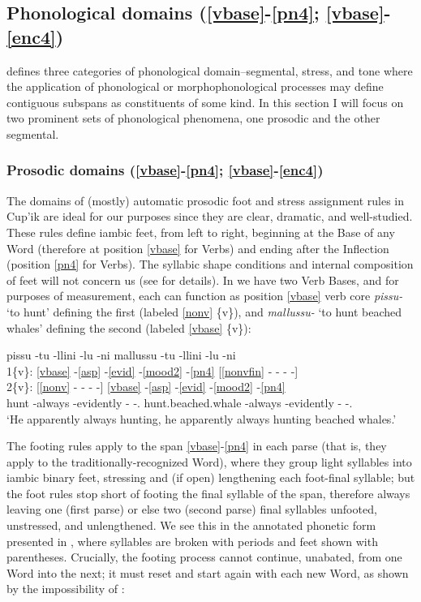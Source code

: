 \documentclass[output=paper]{langscibook}
\begin{document}
\subsection{Phonological domains (\ref{vbase}-\ref{pn4}; \ref{vbase}-\ref{enc4})} 
\label{sec:5.7}

\citet[16]{Tallman2021} defines three categories of phonological domain--segmental, stress, and tone where the application of phonological or morphophonological processes may define contiguous subspans as constituents of some kind. In this section I will focus on two prominent sets of phonological phenomena, one prosodic and the other segmental.

\subsubsection{Prosodic domains (\ref{vbase}-\ref{pn4}; \ref{vbase}-\ref{enc4})} \label{sec:5.7.1}

The domains of (mostly) automatic prosodic foot and stress assignment rules in Cup'ik are ideal for our purposes since they are clear, dramatic, and well-studied. These rules define iambic feet, from left to right, beginning at the Base of any Word (therefore at position \ref{vbase} for Verbs) and ending after the Inflection (position \ref{pn4} for Verbs). The syllabic shape conditions and internal composition of feet will not concern us (see \citealt{Woodbury1981,Woodbury1987} for details). In  we have two Verb Bases, and for purposes of measurement, each can function as position \ref{vbase} verb core \textit{pissu-} `to hunt' defining the first (labeled \ref{nonv} \{v\}), and \textit{mallussu-} `to hunt beached whales' defining the second (labeled \ref{vbase} \{v\}):

\ea\label{ex:key:39}
\gllll {} pissu -tu -llini -lu -ni mallussu -tu -llini -lu -ni \\
    1\{v\}: \ref{vbase} -\ref{asp} -\ref{evid} -\ref{mood2} -\ref{pn4} [\ref{nonvfin} - - - -] \\
    2\{v\}: [\ref{nonv} - - - -] \ref{vbase} -\ref{asp} -\ref{evid} -\ref{mood2} -\ref{pn4} \\
      {} hunt -always -evidently -\Appos{} -\Tsg{}.\Sarg{} hunt.beached.whale -always -evidently -\Appos{} -\Tsg{}.\Sarg{} \\
\glt `He apparently always hunting, he apparently always hunting beached whales.'
\z

The footing rules apply to the span \ref{vbase}-\ref{pn4} in each parse (that is, they apply to the traditionally-recognized Word), where they group light syllables into iambic binary feet, stressing and (if open) lengthening each foot-final syllable; but the foot rules stop short of footing the final syllable of the span, therefore always leaving one (first parse) or else two (second parse) final syllables unfooted, unstressed, and unlengthened. We see this in the annotated phonetic form presented in , where syllables are broken with periods and feet shown with parentheses. Crucially, the footing process cannot continue, unabated, from one Word into the next; it must reset and start again with each new Word, as shown by the impossibility of :
\end{document}

